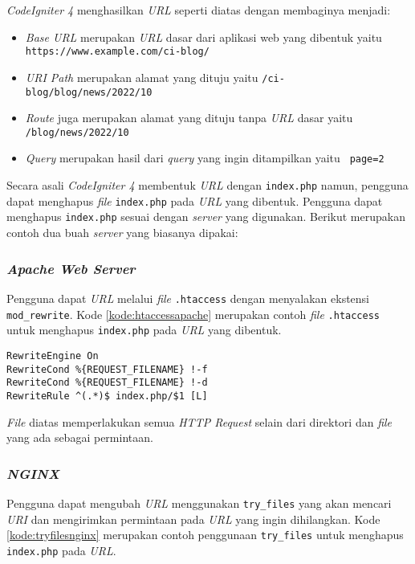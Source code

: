 \textit{CodeIgniter 4} menghasilkan \textit{URL} seperti diatas dengan membaginya menjadi:

\begin{itemize}
\item \textit{Base URL} merupakan \textit{URL} dasar dari aplikasi web yang dibentuk yaitu \texttt{	
https://www.example.com/ci-blog/}
\item \textit{URI Path} merupakan alamat yang dituju yaitu \texttt{/ci-blog/blog/news/2022/10} 
\item \textit{Route} juga merupakan alamat yang dituju tanpa \textit{URL} dasar yaitu \texttt{/blog/news/2022/10} 
\item \textit{Query} merupakan hasil dari \textit{query} yang ingin ditampilkan yaitu \texttt{	
page=2}
\end{itemize}

Secara asali \textit{CodeIgniter 4} membentuk \textit{URL} dengan \verb|index.php| namun, pengguna dapat menghapus \textit{file} \verb|index.php| pada \textit{URL} yang dibentuk. Pengguna dapat menghapus \verb|index.php| sesuai dengan \textit{server} yang digunakan. Berikut merupakan contoh dua buah \textit{server} yang biasanya dipakai:

\subsubsection{\textit{Apache Web Server}}
Pengguna dapat \textit{URL} melalui \textit{file} \verb|.htaccess| dengan menyalakan ekstensi \verb|mod_rewrite|. Kode \ref{kode:htaccessapache} merupakan contoh \textit{file} \verb|.htaccess| untuk menghapus \verb|index.php| pada \textit{URL} yang dibentuk.

\begin{lstlisting}[caption=Contoh \textit{file} \texttt{.htacess} pada \textit{Apache Web Server}. ,label=kode:htaccessapache]
RewriteEngine On
RewriteCond %{REQUEST_FILENAME} !-f
RewriteCond %{REQUEST_FILENAME} !-d
RewriteRule ^(.*)$ index.php/$1 [L]
\end{lstlisting}

\textit{File} diatas memperlakukan semua \textit{HTTP Request} selain dari direktori dan \textit{file} yang ada sebagai permintaan.

\subsubsection{\textit{NGINX}}
Pengguna dapat mengubah \textit{URL} menggunakan \verb|try_files| yang akan mencari \textit{URI} dan mengirimkan permintaan pada \textit{URL} yang ingin dihilangkan. Kode \ref{kode:tryfilesnginx} merupakan contoh penggunaan \verb|try_files| untuk menghapus \verb|index.php| pada \textit{URL}.

